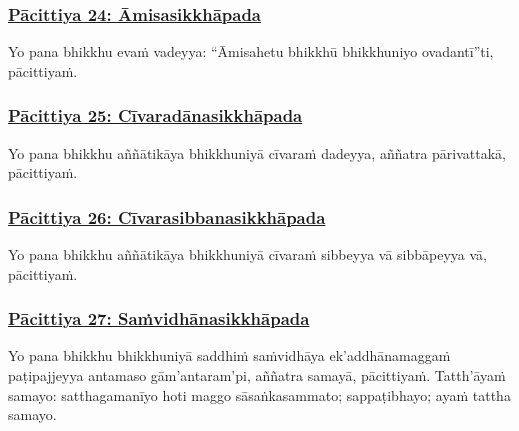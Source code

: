 \subsubsection*{\hyperref[exp24]{Pācittiya 24: Āmisasikkhāpada}}
\label{pac24}

Yo pana bhikkhu evaṁ vadeyya: ``Āmisahetu\makeatletter\hyperlink{endnote268-appendix}\makeatother{} bhikkhū\makeatletter\hyperlink{endnote269-appendix}\makeatother{} bhikkhuniyo ovadantī''ti, pācittiyaṁ.



\subsubsection*{\hyperref[exp25]{Pācittiya 25: Cīvaradānasikkhāpada}}
\label{pac25}

Yo pana bhikkhu aññātikāya bhikkhuniyā cīvaraṁ dadeyya, aññatra pārivattakā,\makeatletter\hyperlink{endnote270-appendix}\makeatother{} pācittiyaṁ.



\subsubsection*{\hyperref[exp26]{Pācittiya 26: Cīvarasibbanasikkhāpada}}
\label{pac26}

Yo pana bhikkhu aññātikāya bhikkhuniyā cīvaraṁ sibbeyya vā sibbāpeyya vā, pācittiyaṁ.



\subsubsection*{\hyperref[exp27]{Pācittiya 27: Saṁvidhānasikkhāpada}}
\label{pac27}

Yo pana bhikkhu bhikkhuniyā saddhiṁ saṁvidhāya ek'addhānamaggaṁ paṭipajjeyya antamaso gām'antaram'pi, aññatra samayā, pācittiyaṁ. Tatth'āyaṁ samayo: satthagamanīyo\makeatletter\hyperlink{endnote271-appendix}\makeatother{} hoti maggo sāsaṅkasammato;\makeatletter\hyperlink{endnote272-appendix}\makeatother{} sappaṭibhayo; ayaṁ tattha samayo.



